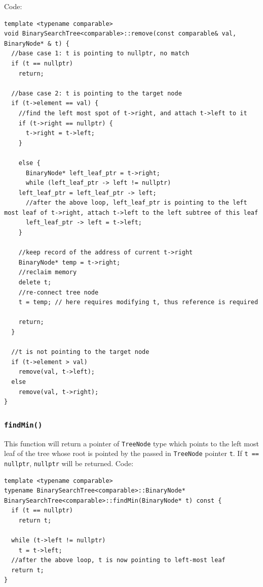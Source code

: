 \documentclass[11pt]{book}
\begin{document}
Code:
\begin{verbatim}
template <typename comparable>
void BinarySearchTree<comparable>::remove(const comparable& val, BinaryNode* & t) {
  //base case 1: t is pointing to nullptr, no match
  if (t == nullptr)
    return;

  //base case 2: t is pointing to the target node
  if (t->element == val) {
    //find the left most spot of t->right, and attach t->left to it
    if (t->right == nullptr) {
      t->right = t->left;
    }

    else {
      BinaryNode* left_leaf_ptr = t->right;
      while (left_leaf_ptr -> left != nullptr)
	left_leaf_ptr = left_leaf_ptr -> left;
      //after the above loop, left_leaf_ptr is pointing to the left most leaf of t->right, attach t->left to the left subtree of this leaf
      left_leaf_ptr -> left = t->left;
    }

    //keep record of the address of current t->right
    BinaryNode* temp = t->right;
    //reclaim memory 
    delete t;
    //re-connect tree node 
    t = temp; // here requires modifying t, thus reference is required

    return;
  }

  //t is not pointing to the target node
  if (t->element > val) 
    remove(val, t->left);
  else
    remove(val, t->right);
}
\end{verbatim}

\subsubsection{\texttt{findMin()}}
\label{sec:orgf21fea3}
This function will return a pointer of \texttt{TreeNode} type which points to the left most leaf of the tree whose root is pointed by the passed in \texttt{TreeNode} pointer \texttt{t}. If \texttt{t == nullptr}, \texttt{nullptr} will be returned. Code:
\begin{verbatim}
template <typename comparable>
typename BinarySearchTree<comparable>::BinaryNode* BinarySearchTree<comparable>::findMin(BinaryNode* t) const {
  if (t == nullptr)
    return t;

  while (t->left != nullptr)
    t = t->left;
  //after the above loop, t is now pointing to left-most leaf
  return t;  
}
\end{verbatim}
\end{document}
